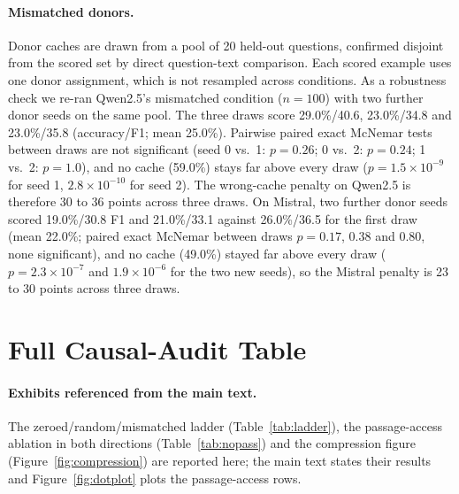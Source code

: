 \documentclass[11pt]{article}
\begin{document}
\paragraph{Mismatched donors.} Donor caches are drawn from a pool of 20
held-out questions, confirmed disjoint from the scored set by direct
question-text comparison. Each scored example uses one donor assignment, which
is not resampled across conditions. As a robustness check we re-ran Qwen2.5's
mismatched condition ($n{=}100$) with two further donor seeds on the same pool.
The three draws score 29.0\%/40.6, 23.0\%/34.8 and 23.0\%/35.8 (accuracy/F1; mean
25.0\%). Pairwise paired exact McNemar tests between draws are not significant
(seed 0 vs.\ 1: $p=0.26$; 0 vs.\ 2: $p=0.24$; 1 vs.\ 2: $p=1.0$), and no cache
(59.0\%) stays far above every draw ($p=1.5\times10^{-9}$ for seed 1,
$2.8\times10^{-10}$ for seed 2). The wrong-cache penalty on Qwen2.5 is therefore
30 to 36 points across three draws. On Mistral, two further donor seeds scored
19.0\%/30.8 F1 and 21.0\%/33.1 against 26.0\%/36.5 for the first draw (mean
22.0\%; paired exact McNemar between draws $p=0.17$, $0.38$ and $0.80$, none
significant), and no cache (49.0\%) stayed far above every draw
($p=2.3\times10^{-7}$ and $1.9\times10^{-6}$ for the two new seeds), so the Mistral
penalty is 23 to 30 points across three draws.

\section{Full Causal-Audit Table}
\label{app:tables}



\paragraph{Exhibits referenced from the main text.} The zeroed/random/mismatched ladder (Table~\ref{tab:ladder}), the passage-access ablation in both directions (Table~\ref{tab:nopass}) and the compression figure (Figure~\ref{fig:compression}) are reported here; the main text states their results and Figure~\ref{fig:dotplot} plots the passage-access rows.
\end{document}
